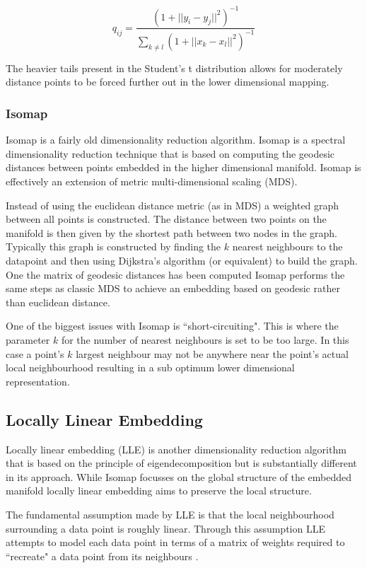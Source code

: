 \begin{equation}
	q_{ij} = \frac{(1 + ||y_i - y_j ||^2)^{-1}}{\sum_{k\neq l} (1 + ||x_k - x_l ||^2)^{-1}} 
\end{equation}

The heavier tails present in the Student's t distribution allows for moderately distance points to be forced further out in the lower dimensional mapping. 

\subsubsection{Isomap}
Isomap \cite{tenenbaum2000global} is a fairly old dimensionality reduction algorithm. Isomap is a spectral dimensionality reduction technique that is based on computing the geodesic distances between points embedded in the higher dimensional manifold. Isomap is effectively an extension of metric multi-dimensional scaling (MDS). 

Instead of using the euclidean distance metric (as in MDS) a weighted graph between all points is constructed. The distance between two points on the manifold is then given by the shortest path between two nodes in the graph. Typically this graph is constructed by finding the $k$ nearest neighbours to the datapoint and then using Dijkstra’s algorithm (or equivalent) to build the graph. One the matrix of geodesic distances has been computed Isomap performs the same steps as classic MDS to achieve an embedding based on geodesic rather than euclidean distance.

One of the biggest issues with Isomap is ``short-circuiting". This is where the parameter $k$ for the number of nearest neighbours is set to be too large. In this case a point's $k$ largest neighbour may not be anywhere near the point's actual local neighbourhood resulting in a sub optimum lower dimensional representation.

\subsection{Locally Linear Embedding}
Locally linear embedding (LLE) \cite{roweis2000nonlinear} is another dimensionality reduction algorithm that is based on the principle of eigendecomposition but is substantially different in its approach. While Isomap focusses on the global structure of the embedded manifold locally linear embedding aims to preserve the local structure.

The fundamental assumption made by LLE is that the local neighbourhood surrounding a data point is roughly linear. Through this assumption LLE attempts to model each data point in terms of a matrix of weights required to ``recreate" a data point from its neighbours \cite{strange2014open}. 

